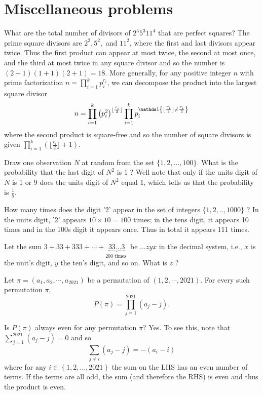 \section{Miscellaneous problems}
\begin{example}
\label{exa:isi2019psa11}What are the total number of divisors of
$2^{5}5^{3}11^{4}$ that are perfect squares? The prime square divisors
are $2^{2},5^{2},$ and $11^{2}$, where the first and last divisors
appear twice. Thus the first product can appear at most twice, the
second at most once, and the third at most twice in any square divisor
and so the number is $(2+1)(1+1)(2+1)=18$. More generally, for any
positive integer $n$ with prime factorization $n=\prod_{i=1}^{k}p_{i}^{r_{i}}$,
we can decompose the product into the largest square divisor 
\[
n=\prod_{i=1}^{k}\left(p_{i}^{2}\right)^{\lfloor\frac{r_{i}}{2}\rfloor}\prod_{i=1}^{k}p_{i}^{\indicate\left\{ \lfloor\frac{r_{i}}{2}\rfloor\neq\frac{r_{i}}{2}\right\} }
\]
where the second product is square-free and so the number of square
divisors is given $\prod_{i=1}^{k}\left(\lfloor\frac{r_{i}}{2}\rfloor+1\right)$.
\end{example}

\begin{example}
\label{exa:isi2019psa18}Draw one observation $N$ at random from
the set $\{1,2,\ldots,100\}$. What is the probability that the last
digit of $N^{2}$ is 1 ? Well note that only if the units digit of
$N$ is 1 or 9 does the units digit of $N^{2}$ equal 1, which tells
us that the probability is $\frac{1}{5}.$
\end{example}

\begin{example}
\label{exa:isi2019psa6} How many times does the digit '2' appear
in the set of integers $\{1,2,..,1000\}$ ? In the units digit, '2'
appears $10\times10=100$ times; in the tens digit, it appears 10
times and in the 100s digit it appears once. Thus in total it appears
111 times.
\end{example}

\begin{example}
\label{exa:isi2019psa5}Let the sum $3+33+333+\cdots+\underbrace{33\ldots3}_{200\text{ times }}$
be $...zyx$ in the decimal system, i.e., $x$ is the unit's digit,
$y$ the ten's digit, and so on. What is $z$ ?
\end{example}

\begin{example}
\label{exa:isi2021psa12} Let $\pi=\left(a_{1},a_{2},\cdots,a_{2021}\right)$
be a permutation of $(1,2,\cdots,2021)$. For every such permutation
$\pi$, 
\[
P(\pi)=\prod_{j=1}^{2021}\left(a_{j}-j\right).
\]

Is $P\left(\pi\right)$ always even for any permutation $\pi$? Yes.
To see this, note that $\sum_{j=1}^{2021}\left(a_{j}-j\right)=0$
and so 
\[
\sum_{j\neq i}\left(a_{j}-j\right)=-\left(a_{i}-i\right)
\]
where for any $i\in\left\{ 1,2,\ldots,2021\right\} $ the sum on the
LHS has an even number of terms. If the terms are all odd, the sum
(and therefore the RHS) is even and thus the product is even.
\end{example}

